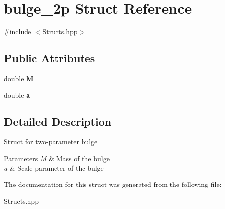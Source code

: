 \hypertarget{structbulge__2p}{}\section{bulge\+\_\+2p Struct Reference}
\label{structbulge__2p}


{\ttfamily \#include $<$Structs.\+hpp$>$}

\subsection*{Public Attributes}
\begin{DoxyCompactItemize}
\item 
\mbox{\label{structbulge__2p_a9aa359566f33482bdc1b80a725ad7003}} 
double {\bfseries M}
\item 
\mbox{\label{structbulge__2p_acea943134cdc4383146793ff1c50d487}} 
double {\bfseries a}
\end{DoxyCompactItemize}


\subsection{Detailed Description}
Struct for two-\/parameter bulge 
\begin{DoxyParams}{Parameters}
{\em M} & Mass of the bulge \\
\hline
{\em a} & Scale parameter of the bulge \\
\hline
\end{DoxyParams}


The documentation for this struct was generated from the following file\+:\begin{DoxyCompactItemize}
\item 
Structs.\+hpp\end{DoxyCompactItemize}
